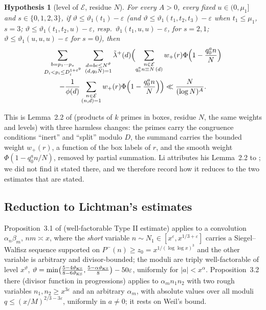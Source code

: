 \documentclass[11pt]{amsart}
\newtheorem{hypothesis}[theorem]{Hypothesis}
\theoremstyle{remark}
\newcommand{\e}{\varepsilon}
\newcommand{\cE}{\mathcal E}
\begin{document}
\begin{hypothesis}[level of $\cE$, residue $N$]\label{hyp:L}
For every $A>0$, every fixed $u\in(0,\mu_1]$ and $s\in\{0,1,2,3\}$, if $\vartheta\le\vartheta_1(t_1)-\e$ (and $\vartheta\le\vartheta_1(t_1,t_2,t_3)-\e$ when $t_1\le\mu_1$, $s=3$; $\vartheta\le\vartheta_1(t_1,t_2,u)-\e$, resp.\ $\vartheta_1(t_1,u,u)-\e$, for $s=2,1$; $\vartheta\le\vartheta_1(u,u,u)-\e$ for $s=0$), then
\begin{multline*}
\sum_{\substack{b=p_1\cdots p_s\\ D_i<p_i\le D_i^{1+\e^9}}}\ \sum_{\substack{d=bc\le N^\vartheta\\ (d,q_0N)=1}}\tilde\lambda^+(d)\Bigl(\sum_{\substack{n\in\cE\\ q_0^an\equiv N\,(d)}}w_+(r)\Phi\Bigl(1-\frac{q_0^an}N\Bigr)\\
-\frac1{\phi(d)}\sum_{\substack{n\in\cE\\ (n,d)=1}}w_+(r)\Phi\Bigl(1-\frac{q_0^an}N\Bigr)\Bigr)\ll\frac N{(\log N)^A}.
\end{multline*}
\end{hypothesis}
This is Lemma~2.2 of \cite{Li} (products of $k$ primes in boxes, residue $N$, the same weights and levels) with three harmless changes: the primes carry the congruence conditions ``inert'' and ``split'' modulo $D$, the summand carries the bounded weight $w_+(r)$, a function of the box labels of $r$, and the smooth weight $\Phi(1-q_0^an/N)$, removed by partial summation. Li attributes his Lemma~2.2 to \cite{Lichtman}; we did not find it stated there, and we therefore record how it reduces to the two estimates that are stated.

\subsection{Reduction to Lichtman's estimates}
Proposition~3.1 of \cite{Lichtman} (well-factorable Type II estimate) applies to a convolution $\alpha_n\beta_m$, $nm\asymp x$, where the \emph{short} variable $n\sim N_1\in[x^\e,x^{1/3+\e}]$ carries a Siegel--Walfisz sequence supported on $P^-(n)\ge z_0=x^{1/(\log\log x)^3}$ and the other variable is arbitrary and divisor-bounded; the moduli are triply well-factorable of level $x^\vartheta$, $\vartheta=\min\bigl(\frac{5-4\vartheta_{\rm KS}}{8-6\vartheta_{\rm KS}},\frac{5-\alpha\vartheta_{\rm KS}}8\bigr)-50\e$, uniformly for $|a|<x^\alpha$. Proposition~3.2 there (divisor function in progressions) applies to $\alpha_m n_1n_2$ with two rough variables $n_1,n_2\ge x^{3\e}$ and an arbitrary $\alpha_m$, with absolute values over all moduli $q\le(x/M)^{2/3-3\e}$, uniformly in $a\ne0$; it rests on Weil's bound.
\end{document}
